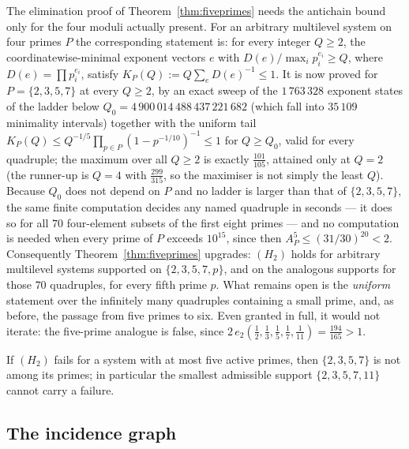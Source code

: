 \begin{remark}\label{rem:K4}
The elimination proof of Theorem~\ref{thm:fiveprimes} needs the antichain bound only for the four
moduli actually present. For an arbitrary multilevel system on four primes $P$ the corresponding
statement is: for every integer $Q\ge2$, the coordinatewise-minimal exponent vectors $e$ with
$D(e)/\max_ip_i^{e_i}\ge Q$, where $D(e)=\prod p_i^{e_i}$, satisfy
$K_P(Q):=Q\sum_eD(e)^{-1}\le1$. It is now proved for $P=\{2,3,5,7\}$ at every $Q\ge2$, by an exact
sweep of the $1\,763\,328$ exponent states of the ladder below
$Q_0=4\,900\,014\,488\,437\,221\,682$ (which fall into $35\,109$ minimality intervals) together with
the uniform tail $K_P(Q)\le Q^{-1/5}\prod_{p\in P}(1-p^{-1/10})^{-1}\le1$ for $Q\ge Q_0$, valid for
every quadruple; the maximum over all $Q\ge2$ is exactly $\tfrac{101}{105}$, attained only at $Q=2$
(the runner-up is $Q=4$ with $\tfrac{299}{315}$, so the maximiser is not simply the least $Q$).
Because $Q_0$ does not depend on $P$ and no ladder is larger than that of $\{2,3,5,7\}$, the same
finite computation decides any named quadruple in seconds --- it does so for all $70$ four-element
subsets of the first eight primes --- and no computation is needed when every prime of $P$ exceeds
$10^{15}$, since then $A_P^5\le(31/30)^{20}<2$. Consequently Theorem~\ref{thm:fiveprimes} upgrades:
$(H_2)$ holds for arbitrary multilevel systems supported on $\{2,3,5,7,p\}$, and on the analogous
supports for those $70$ quadruples, for every fifth prime $p$.
What remains open is the \emph{uniform} statement over the infinitely many quadruples containing a
small prime, and, as before, the passage from five primes to six. Even granted in full, it would not
iterate: the five-prime analogue is false, since
$2\,e_2(\tfrac12,\tfrac13,\tfrac15,\tfrac17,\tfrac1{11})=\tfrac{194}{165}>1$.
\end{remark}

\begin{corollary}\label{cor:smallestsupport}
If $(H_2)$ fails for a system with at most five active primes, then $\{2,3,5,7\}$ is not among its
primes; in particular the smallest admissible support $\{2,3,5,7,11\}$ cannot carry a failure.
\end{corollary}

\subsection*{The incidence graph}

